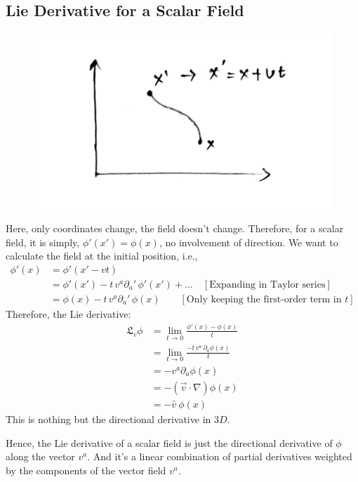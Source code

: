 \documentclass[14pt]{article} %
\begin{document}
\subsection{Lie Derivative for a Scalar Field}
\vspace{-0.5cm}
\begin{figure}[H]
\centering
\includegraphics[width=0.4\linewidth]{L3_5.jpg}
\caption*{}
\end{figure}
\vspace{-1cm}
Here, only coordinates change, the field doesn't change. Therefore, for a scalar field, it is simply, $\phi'(x') = \phi(x)$, no involvement of direction. We want to calculate the field at the initial position, i.e.,
\begin{align*}
\phi'(x) &= \phi'(x' - vt) \\
&= \phi'(x') - t\, v^a \partial_{a} '\, \phi'(x') + \dots \quad  [\text{Expanding in Taylor series}] \\
&= \phi(x) - t\, v^a \partial_a'\, \phi(x) \quad \quad [\text{Only keeping the first-order term in $t$}]
\end{align*}
Therefore, the Lie derivative:
\begin{align*}
\mathfrak{L}_v \phi &= \lim_{t \to 0} \frac{\phi'(x) - \phi(x)}{t} \\
&= \lim_{t \to 0} \frac{- t \,v^a\, \partial_a \phi(x)}{t} \\
&= -v^a \partial_a \phi(x) \\
&= - (\vec{v} \cdot \nabla) \phi(x) \\
&= - \hat{v}~ \phi(x)
\end{align*}
This is nothing but the directional derivative in $3D$.

Hence, the Lie derivative of a scalar field is just the directional derivative of $\phi$ along the vector $v^a$. And it's a linear combination of partial derivatives weighted by the components of the vector field $v^a$.
\end{document}
